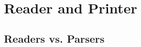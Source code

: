 \documentclass[a4paper,10pt,twoside]{article}
\newcommand{\el}{Emacs Lisp}
\newcommand{\cl}{Common Lisp}
\begin{document}





\section{Reader and Printer}
\label{sec:reader-printer}

\subsection{Readers vs. Parsers}
\label{subsec:readers-vs-parsers}
\end{document}
